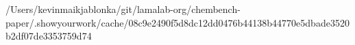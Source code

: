 /Users/kevinmaikjablonka/git/lamalab-org/chembench-paper/.showyourwork/cache/08c9e2490f5d8dc12dd0476b44138b44770e5dbade3520b2df07de3353759d74